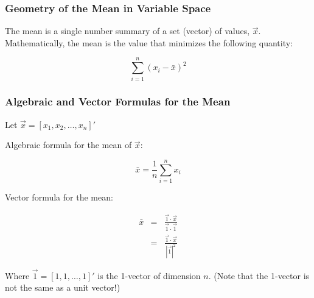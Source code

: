 \documentclass{beamer}
\begin{document}
\begin{frame}
  \frametitle{Geometry of the Mean in Variable Space}

The mean is a single number summary of a set (vector) of values, $\vec{x}$.  Mathematically, the mean is the value that minimizes the following quantity:

\begin{equation*}
 \sum_{i=1}^{n}(x_i-\bar{x})^2 
\end{equation*}


\medskip

\begin{center}
\end{center}





\end{frame}


\begin{frame}
  \frametitle{Algebraic and Vector Formulas for the Mean}

Let $\vec{x} = [x_1, x_2, \ldots, x_n]'$

\medskip

Algebraic formula for the mean of $\vec{x}$:

\begin{equation*}
 \bar{x} = \frac{1}{n}\sum_{i=1}^{n} x_i
\end{equation*}

\medskip

Vector formula for the mean:

\begin{eqnarray*}
 \bar{x} &=& \frac{\vec{1} \cdot \vec{x}}{\vec{1} \cdot \vec{1}} \\
         &=& \frac{\vec{1} \cdot \vec{x}}{|\vec{1}|^2}
\end{eqnarray*}

Where $\vec{1} = [1, 1, \ldots, 1]'$ is the 1-vector of dimension $n$. 
(Note that the 1-vector is not the same as a unit vector!)



\end{frame}
\end{document}
